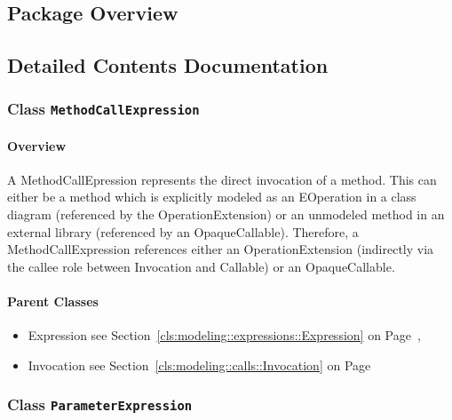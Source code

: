 \subsection{Package Overview}
			
		



\subsection{Detailed Contents Documentation}
\subsubsection{\Large{Class \bfseries \texttt{MethodCallExpression}\normalfont}}
\label{cls:modeling::calls::expressions::MethodCallExpression} 
\paragraph{Overview}

	
			
A MethodCallEpression represents the direct invocation of a method. This can either be a method which is explicitly modeled as an EOperation in a class diagram (referenced by the OperationExtension) or an unmodeled method in an external library (referenced by an OpaqueCallable). Therefore, a MethodCallExpression references either an OperationExtension (indirectly via the callee role between Invocation and Callable) or an OpaqueCallable.	
		
	



\paragraph{Parent Classes}
\begin{itemize}
\item Expression see Section~\ref{cls:modeling::expressions::Expression} on Page~\pageref{cls:modeling::expressions::Expression}, \item Invocation see Section~\ref{cls:modeling::calls::Invocation} on Page~\pageref{cls:modeling::calls::Invocation}\end{itemize}
\subsubsection{\Large{Class \bfseries \texttt{ParameterExpression}\normalfont}}
\label{cls:modeling::calls::expressions::ParameterExpression} 
